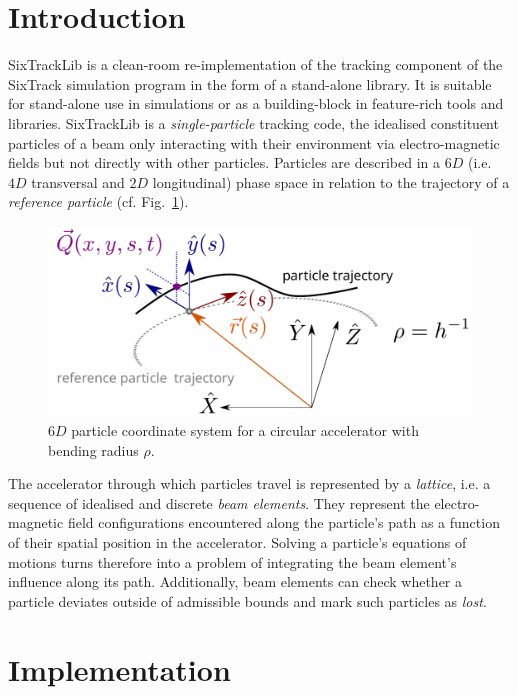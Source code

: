 \documentclass[a4paper,
               refpage,       %
               keeplastbox,   %
               ]{jacow}
\begin{document}
\section{Introduction}
SixTrackLib\cite{sixtracklib-repo-2021} is a clean-room re-implementation of the tracking component of the SixTrack\cite{demaria2019}\cite{sixtrack-repo-2021} simulation program in the form of a stand-alone library. It is suitable for stand-alone use in simulations or as a building-block in feature-rich tools and libraries. SixTrackLib is a \textit{single-particle} tracking code, the idealised constituent particles of a beam only interacting with their environment via electro-magnetic fields but not directly with other particles. Particles are described in a $6D$ (i.e. $4D$ transversal and $2D$ longitudinal) phase space in relation to the trajectory of a \textit{reference particle} (cf. Fig.~\ref{fig:coordinates}).
\begin{figure}[!htb]
   \centering
   \includegraphics*[width=.8\columnwidth]{fig_coordinates}
   \caption{$6D$ particle coordinate system for a circular accelerator with bending radius $\rho$.}
   \label{fig:coordinates}
\end{figure}
The accelerator through which particles travel is represented by a \textit{lattice}, i.e. a sequence of idealised and discrete \textit{beam elements}. They represent the electro-magnetic field configurations encountered along the particle's path as a function of their spatial position in the accelerator. Solving a particle's equations of motions turns therefore into a problem of integrating the beam element's influence along its path. Additionally, beam elements can check whether a particle deviates outside of admissible bounds and mark such particles as \textit{lost}. 


\section{Implementation}
\end{document}
